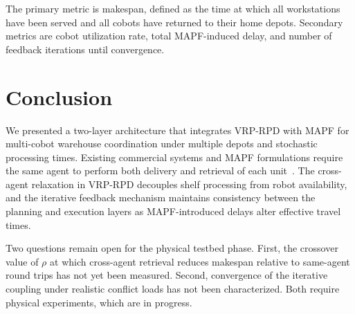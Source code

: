 \documentclass{article}
\begin{document}
The primary metric is makespan, defined as the time at which all workstations
have been served and all cobots have returned to their home depots. Secondary
metrics are cobot utilization rate, total MAPF-induced delay, and number of
feedback iterations until convergence.

\section{Conclusion}
\label{sec:conclusion}

We presented a two-layer architecture that integrates VRP-RPD with MAPF for
multi-cobot warehouse coordination under multiple depots and stochastic
processing times. Existing commercial systems and MAPF formulations require the
same agent to perform both delivery and retrieval of each unit~\cite{kiva_patent_2014,
ma2017lifelong}. The cross-agent relaxation in VRP-RPD decouples shelf
processing from robot availability, and the iterative feedback mechanism
maintains consistency between the planning and execution layers as
MAPF-introduced delays alter effective travel times.

Two questions remain open for the physical testbed phase. First, the crossover
value of $\rho$ at which cross-agent retrieval reduces makespan relative to
same-agent round trips has not yet been measured. Second, convergence of the
iterative coupling under realistic conflict loads has not been characterized.
Both require physical experiments, which are in progress.



\end{document}
